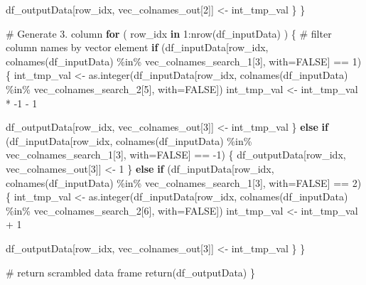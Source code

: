 \documentclass[
]{article}
\newenvironment{Shaded}{\begin{snugshade}}{\end{snugshade}}
\newcommand{\AttributeTok}[1]{\textcolor[rgb]{0.00,0.34,0.68}{#1}}
\newcommand{\CommentTok}[1]{\textcolor[rgb]{0.54,0.53,0.53}{#1}}
\newcommand{\ConstantTok}[1]{\textcolor[rgb]{0.67,0.33,0.00}{#1}}
\newcommand{\ControlFlowTok}[1]{\textcolor[rgb]{0.12,0.11,0.11}{\textbf{#1}}}
\newcommand{\DecValTok}[1]{\textcolor[rgb]{0.69,0.50,0.00}{#1}}
\newcommand{\FunctionTok}[1]{\textcolor[rgb]{0.39,0.29,0.61}{#1}}
\newcommand{\NormalTok}[1]{\textcolor[rgb]{0.12,0.11,0.11}{#1}}
\newcommand{\OtherTok}[1]{\textcolor[rgb]{0.00,0.43,0.16}{#1}}
\newcommand{\SpecialCharTok}[1]{\textcolor[rgb]{0.24,0.68,0.91}{#1}}
\begin{document}
\begin{Shaded}
\begin{Highlighting}[]
\NormalTok{      df\_outputData[row\_idx, vec\_colnames\_out[}\DecValTok{2}\NormalTok{]] }\OtherTok{\textless{}{-}}\NormalTok{ int\_tmp\_val}
\NormalTok{    \}}
\NormalTok{  \}}
  
  \CommentTok{\# Generate 3. column}
  \ControlFlowTok{for}\NormalTok{ ( row\_idx }\ControlFlowTok{in} \DecValTok{1}\SpecialCharTok{:}\FunctionTok{nrow}\NormalTok{(df\_inputData) ) \{}
    \CommentTok{\# filter column names by vector element}
    \ControlFlowTok{if}\NormalTok{ (df\_inputData[row\_idx, }\FunctionTok{colnames}\NormalTok{(df\_inputData) }\SpecialCharTok{\%in\%}\NormalTok{ vec\_colnames\_search\_1[}\DecValTok{3}\NormalTok{], }\AttributeTok{with=}\ConstantTok{FALSE}\NormalTok{] }\SpecialCharTok{==} \DecValTok{1}\NormalTok{) \{}
\NormalTok{      int\_tmp\_val }\OtherTok{\textless{}{-}} \FunctionTok{as.integer}\NormalTok{(df\_inputData[row\_idx, }\FunctionTok{colnames}\NormalTok{(df\_inputData) }\SpecialCharTok{\%in\%}\NormalTok{ vec\_colnames\_search\_2[}\DecValTok{5}\NormalTok{], }\AttributeTok{with=}\ConstantTok{FALSE}\NormalTok{])}
\NormalTok{      int\_tmp\_val }\OtherTok{\textless{}{-}}\NormalTok{ int\_tmp\_val }\SpecialCharTok{*} \SpecialCharTok{{-}}\DecValTok{1} \SpecialCharTok{{-}} \DecValTok{1}
      
\NormalTok{      df\_outputData[row\_idx, vec\_colnames\_out[}\DecValTok{3}\NormalTok{]] }\OtherTok{\textless{}{-}}\NormalTok{ int\_tmp\_val}
\NormalTok{    \} }
    \ControlFlowTok{else} \ControlFlowTok{if}\NormalTok{ (df\_inputData[row\_idx, }\FunctionTok{colnames}\NormalTok{(df\_inputData) }\SpecialCharTok{\%in\%}\NormalTok{ vec\_colnames\_search\_1[}\DecValTok{3}\NormalTok{], }\AttributeTok{with=}\ConstantTok{FALSE}\NormalTok{] }\SpecialCharTok{==} \SpecialCharTok{{-}}\DecValTok{1}\NormalTok{) \{}
\NormalTok{      df\_outputData[row\_idx, vec\_colnames\_out[}\DecValTok{3}\NormalTok{]] }\OtherTok{\textless{}{-}} \DecValTok{1}
\NormalTok{    \} }
    \ControlFlowTok{else} \ControlFlowTok{if}\NormalTok{ (df\_inputData[row\_idx, }\FunctionTok{colnames}\NormalTok{(df\_inputData) }\SpecialCharTok{\%in\%}\NormalTok{ vec\_colnames\_search\_1[}\DecValTok{3}\NormalTok{], }\AttributeTok{with=}\ConstantTok{FALSE}\NormalTok{] }\SpecialCharTok{==} \DecValTok{2}\NormalTok{) \{}
\NormalTok{      int\_tmp\_val }\OtherTok{\textless{}{-}} \FunctionTok{as.integer}\NormalTok{(df\_inputData[row\_idx, }\FunctionTok{colnames}\NormalTok{(df\_inputData) }\SpecialCharTok{\%in\%}\NormalTok{ vec\_colnames\_search\_2[}\DecValTok{6}\NormalTok{], }\AttributeTok{with=}\ConstantTok{FALSE}\NormalTok{])}
\NormalTok{      int\_tmp\_val }\OtherTok{\textless{}{-}}\NormalTok{ int\_tmp\_val }\SpecialCharTok{+} \DecValTok{1}
      
\NormalTok{      df\_outputData[row\_idx, vec\_colnames\_out[}\DecValTok{3}\NormalTok{]] }\OtherTok{\textless{}{-}}\NormalTok{ int\_tmp\_val}
\NormalTok{    \}}
\NormalTok{  \}}
  
  \CommentTok{\# return scrambled data frame}
  \FunctionTok{return}\NormalTok{(df\_outputData)}
\NormalTok{\}}
\end{Highlighting}
\end{Shaded}
\end{document}
